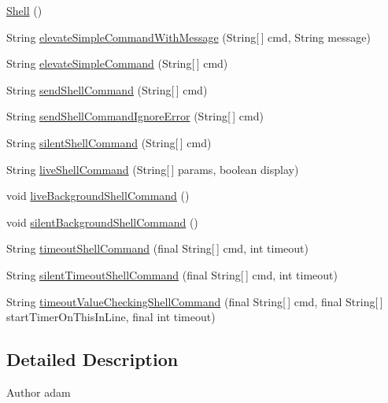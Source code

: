 \begin{DoxyCompactItemize}
\item 
\hyperlink{classCASUAL_1_1Shell_a708fd05c53f187f1e8278972a2a55b5c}{Shell} ()
\item 
String \hyperlink{classCASUAL_1_1Shell_ae42f2d9c2e19a6185deff5b9600844fb}{elevate\-Simple\-Command\-With\-Message} (String\mbox{[}$\,$\mbox{]} cmd, String message)
\item 
String \hyperlink{classCASUAL_1_1Shell_a228ae0a36fd9bf8773b20d9ce67d186a}{elevate\-Simple\-Command} (String\mbox{[}$\,$\mbox{]} cmd)
\item 
String \hyperlink{classCASUAL_1_1Shell_a7b3433f703f854ebccf0d0fb03ace169}{send\-Shell\-Command} (String\mbox{[}$\,$\mbox{]} cmd)
\item 
String \hyperlink{classCASUAL_1_1Shell_abf0198707d3bbaac312a099b70896c8f}{send\-Shell\-Command\-Ignore\-Error} (String\mbox{[}$\,$\mbox{]} cmd)
\item 
String \hyperlink{classCASUAL_1_1Shell_a7b5fe192fb2f8643e0abf9be080108c6}{silent\-Shell\-Command} (String\mbox{[}$\,$\mbox{]} cmd)
\item 
String \hyperlink{classCASUAL_1_1Shell_a8bb7dfcf5e0b9fac3168bc2a89115964}{live\-Shell\-Command} (String\mbox{[}$\,$\mbox{]} params, boolean display)
\item 
void \hyperlink{classCASUAL_1_1Shell_ad5bcb0ff18bd7023fa763901f4410e24}{live\-Background\-Shell\-Command} ()
\item 
void \hyperlink{classCASUAL_1_1Shell_a23d9169e1e0e9374d1f6e34979d10378}{silent\-Background\-Shell\-Command} ()
\item 
String \hyperlink{classCASUAL_1_1Shell_a84ab38f944a2af24e3283103e80b743c}{timeout\-Shell\-Command} (final String\mbox{[}$\,$\mbox{]} cmd, int timeout)
\item 
String \hyperlink{classCASUAL_1_1Shell_a50d89a1c8176f36f111e9b259e8fb3d7}{silent\-Timeout\-Shell\-Command} (final String\mbox{[}$\,$\mbox{]} cmd, int timeout)
\item 
String \hyperlink{classCASUAL_1_1Shell_adbc863b6cf3a4606764bdc57bb86e1ed}{timeout\-Value\-Checking\-Shell\-Command} (final String\mbox{[}$\,$\mbox{]} cmd, final String\mbox{[}$\,$\mbox{]} start\-Timer\-On\-This\-In\-Line, final int timeout)
\end{DoxyCompactItemize}


\subsection{Detailed Description}
\begin{DoxyAuthor}{Author}
adam 
\end{DoxyAuthor}


